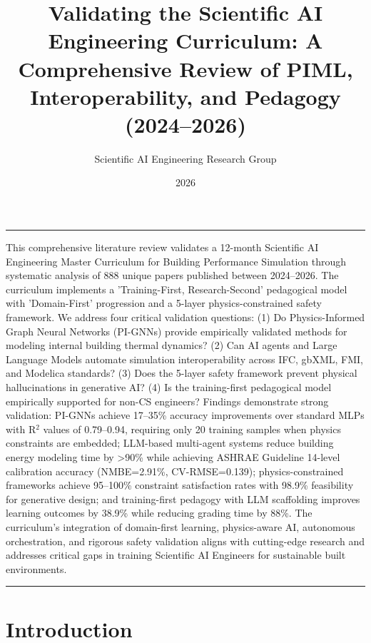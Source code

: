 \documentclass[12pt,a4paper]{article}
\renewenvironment{abstract}{%
  \vspace{8pt}
  \noindent\rule{\linewidth}{0.4pt}\vspace{4pt}
  \noindent{\bfseries Abstract.}\quad\itshape}
  {\par\vspace{4pt}\noindent\rule{\linewidth}{0.4pt}\vspace{8pt}}
\begin{document}
\title{\textbf{Validating the Scientific AI Engineering Curriculum: A Comprehensive Review of PIML, Interoperability, and Pedagogy (2024--2026)}}
\author{Scientific AI Engineering Research Group}
\date{2026}
\maketitle
\thispagestyle{fancy}




\begin{abstract}

This comprehensive literature review validates a 12-month Scientific AI Engineering Master Curriculum for Building Performance Simulation through systematic analysis of 888 unique papers published between 2024--2026. The curriculum implements a 'Training-First, Research-Second' pedagogical model with 'Domain-First' progression and a 5-layer physics-constrained safety framework. We address four critical validation questions: (1) Do Physics-Informed Graph Neural Networks (PI-GNNs) provide empirically validated methods for modeling internal building thermal dynamics? (2) Can AI agents and Large Language Models automate simulation interoperability across IFC, gbXML, FMI, and Modelica standards? (3) Does the 5-layer safety framework prevent physical hallucinations in generative AI? (4) Is the training-first pedagogical model empirically supported for non-CS engineers? Findings demonstrate strong validation: PI-GNNs achieve 17--35\% accuracy improvements over standard MLPs with R$^2$ values of 0.79--0.94, requiring only 20 training samples when physics constraints are embedded; LLM-based multi-agent systems reduce building energy modeling time by >90\% while achieving ASHRAE Guideline 14-level calibration accuracy (NMBE=2.91\%, CV-RMSE=0.139); physics-constrained frameworks achieve 95--100\% constraint satisfaction rates with 98.9\% feasibility for generative design; and training-first pedagogy with LLM scaffolding improves learning outcomes by 38.9\% while reducing grading time by 88\%. The curriculum's integration of domain-first learning, physics-aware AI, autonomous orchestration, and rigorous safety validation aligns with cutting-edge research and addresses critical gaps in training Scientific AI Engineers for sustainable built environments.




\end{abstract}
\section{Introduction}
\end{document}
